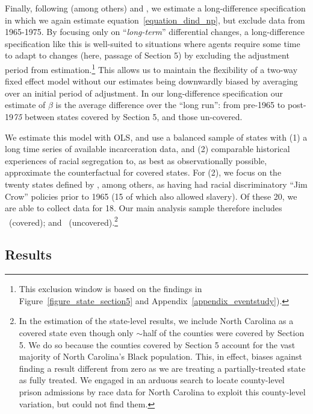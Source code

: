 \documentclass[12pt]{article}
\begin{document}
Finally, following (among others) \cite{Washington:2014tk} and \cite{Facchini:2020tb}, we estimate a long-difference specification in which we again estimate equation~\ref{equation_dind_np}, but exclude data from 1965-1975. By focusing only on ``\emph{long-term}'' differential changes, a long-difference specification like this is well-suited to situations where agents require some time to adapt to changes (here, passage of Section 5) by excluding the adjustment period from estimation.\footnote{This exclusion window is based on the findings in Figure~\ref{figure_state_section5} and Appendix~\ref{appendix_eventstudy}).} This allows us to maintain the flexibility of a two-way fixed effect model without our estimates being downwardly biased by averaging over an initial period of adjustment. In our long-difference specification our estimate of $\beta$ is the average difference over the ``long run'': from pre-1965 to post-19\emph{75} between states covered by Section 5, and those un-covered.

We estimate this model with OLS, and use a balanced sample of states with (1) a long time series of available incarceration data, and (2) comparable historical experiences of racial segregation to, as best as observationally possible, approximate the counterfactual for covered states.  For (2), we focus on the twenty states defined by \cite{Katznelson:2012vu}, among others, as having had racial discriminatory ``Jim Crow'' policies prior to 1965 (15 of which also allowed slavery). Of these 20, we are able to collect data for 18.  Our main analysis sample therefore includes  \unskip~(covered); and \unskip~(uncovered).\footnote{In the estimation of the state-level results, we include North Carolina as a covered state even though only $\sim$\unskip half of the counties were covered by Section 5. We do so because the counties covered by Section 5 account for the vast majority of North Carolina's Black population. This, in effect, biases against finding a result different from zero as we are treating a partially-treated state as fully treated.  We engaged in an arduous search to locate county-level prison admissions by race data for North Carolina to exploit this county-level variation, but could not find them.}




\subsection*{Results}
\end{document}
